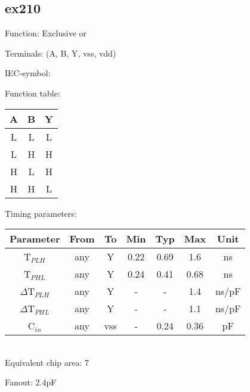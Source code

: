 \subsection{ex210}

Function: Exclusive or

Terminals: (A, B, Y, vss, vdd)


IEC-symbol:
\begin{figure}[bth]
\end{figure}

\begin{minipage}[t]{0.3\textwidth}
Function table:\\

\begin{tabular}{|c|c||c|}
\hline
A	&B	&Y\\
\hline
L	&L	&L\\
L	&H	&H\\
H	&L	&H\\
H	&H	&L\\
\hline
\end{tabular}
\end{minipage}
\hfill
\begin{minipage}[t]{0.6\textwidth}
Timing parameters:\\

\begin{tabular}{|c|cc|ccc|c|}
\hline
Parameter               &From            &To   &Min	&Typ	&Max    &Unit\\
\hline
T$_{PLH}$               &any    	&Y     &0.22	&0.69	&1.6    &ns\\
T$_{PHL}$               &any    	&Y     &0.24	&0.41	&0.68    &ns\\
\hline
$\Delta$T$_{PLH}$       &any          	&Y     &-	&-	&1.4    &ns/pF\\
$\Delta$T$_{PHL}$       &any           	&Y     &-	&-	&1.1    &ns/pF\\
\hline
C$_{in}$                &any	    	&vss   &-	&0.24	&0.36   &pF\\
\hline
\end{tabular}
\end{minipage}
\\

Equivalent chip area: 7

Fanout: 2.4pF

\clearpage
